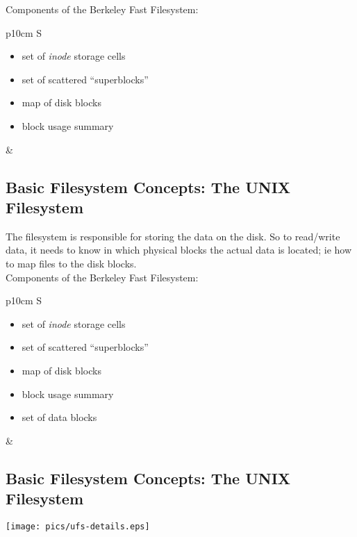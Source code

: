 \documentclass[xga]{xdvislides}
\begin{document}
Components of the Berkeley Fast Filesystem:
\\

\begin{tabular}{ p{10cm} S }
\begin{itemize}
	\item set of {\em inode} storage cells
	\item set of scattered ``superblocks''
	\item map of disk blocks
	\item block usage summary
\end{itemize}
&  \\
\end{tabular}

\subsection{Basic Filesystem Concepts: The UNIX Filesystem}
The filesystem is responsible for storing the data on the disk.
So to read/write data, it needs to know in which physical blocks the actual
data is located; ie how to map files to the disk blocks.
\\

Components of the Berkeley Fast Filesystem:
\\

\begin{tabular}{ p{10cm} S }
\begin{itemize}
	\item set of {\em inode} storage cells
	\item set of scattered ``superblocks''
	\item map of disk blocks
	\item block usage summary
	\item set of data blocks
\end{itemize}
&  \\
\end{tabular}

\subsection{Basic Filesystem Concepts: The UNIX Filesystem}
\begin{center}
	\texttt{[image: pics/ufs-details.eps]} \\
\end{center}
\vspace*{\fill}
\end{document}
